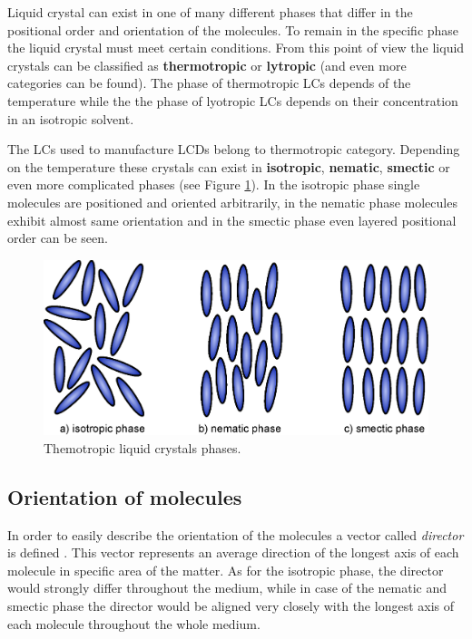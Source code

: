 Liquid crystal can exist in one of many different phases that differ in the positional order and orientation of the molecules. To remain in the specific phase the liquid crystal must meet certain conditions. From this point of view the liquid crystals can be classified as \textbf{thermotropic} or \textbf{lytropic} \cite{Desimpel2006LCD} (and even more categories can be found). The phase of thermotropic LCs depends of the temperature while the the phase of lyotropic LCs depends on their concentration in an isotropic solvent.

The LCs used to manufacture LCDs belong to thermotropic category. Depending on the temperature these crystals can exist in \textbf{isotropic}, \textbf{nematic}, \textbf{smectic} or even more complicated phases \cite{Desimpel2006LCD} (see Figure \ref{fig:lc_phases}). In the isotropic phase single molecules are positioned and oriented arbitrarily, in the nematic phase molecules exhibit almost same orientation and in the smectic phase even layered positional order can be seen.

\begin{figure}[hbt]
\centering
\includegraphics[width=12cm]{img/lc_phases.eps}
\caption{Themotropic liquid crystals phases.}
\label{fig:lc_phases}
\end{figure}


\subsection{Orientation of molecules}
In order to easily describe the orientation of the molecules a vector called \textit{director} is defined \cite{Desimpel2006LCD}. This vector represents an average direction of the longest axis of each molecule in specific area of the matter. As for the isotropic phase, the director would strongly differ throughout the medium, while in case of the nematic and smectic phase the director would be aligned very closely with the longest axis of each molecule throughout the whole medium.

